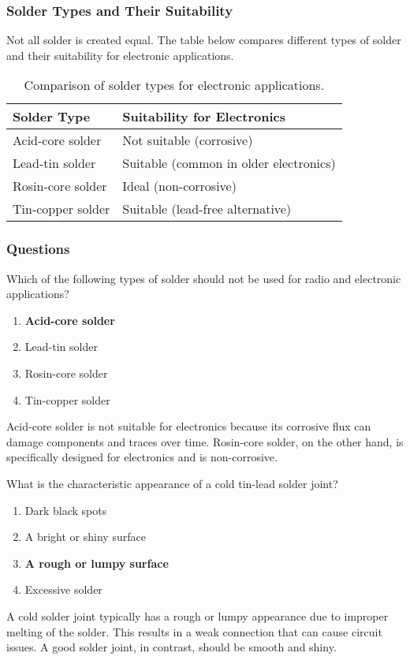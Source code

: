 \subsubsection*{Solder Types and Their Suitability}
Not all solder is created equal. The table below compares different types of solder and their suitability for electronic applications.

\begin{table}[h]
    \centering
    \caption{Comparison of solder types for electronic applications.}
    \label{tab:solder-types}
    \begin{tabular}{|l|l|}
        \hline
        \textbf{Solder Type} & \textbf{Suitability for Electronics} \\
        \hline
        Acid-core solder & Not suitable (corrosive) \\
        Lead-tin solder & Suitable (common in older electronics) \\
        Rosin-core solder & Ideal (non-corrosive) \\
        Tin-copper solder & Suitable (lead-free alternative) \\
        \hline
    \end{tabular}
\end{table}

\subsubsection{Questions}
\begin{tcolorbox}[colback=gray!10!white,colframe=black!75!black,title={T7D08}]
    Which of the following types of solder should not be used for radio and electronic applications?
    \begin{enumerate}[label=\Alph*),noitemsep]
        \item \textbf{Acid-core solder}
        \item Lead-tin solder
        \item Rosin-core solder
        \item Tin-copper solder
    \end{enumerate}
\end{tcolorbox}

Acid-core solder is not suitable for electronics because its corrosive flux can damage components and traces over time. Rosin-core solder, on the other hand, is specifically designed for electronics and is non-corrosive.

\begin{tcolorbox}[colback=gray!10!white,colframe=black!75!black,title={T7D09}]
    What is the characteristic appearance of a cold tin-lead solder joint?
    \begin{enumerate}[label=\Alph*),noitemsep]
        \item Dark black spots
        \item A bright or shiny surface
        \item \textbf{A rough or lumpy surface}
        \item Excessive solder
    \end{enumerate}
\end{tcolorbox}

A cold solder joint typically has a rough or lumpy appearance due to improper melting of the solder. This results in a weak connection that can cause circuit issues. A good solder joint, in contrast, should be smooth and shiny.
